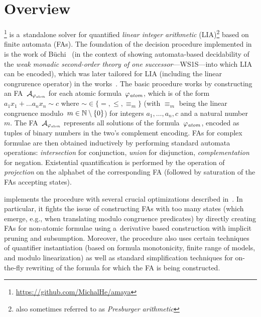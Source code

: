 \documentclass[acmsmall,screen,nonacm=true]{acmart}
\begin{document}
\vspace{-0.0mm}
\section{Overview}
\vspace{-0.0mm}

\amaya\footnote{\url{https://github.com/MichalHe/amaya}} is a~standalone solver for
quantified \emph{linear integer arithmetic}
(LIA)\footnote{also sometimes referred to as \emph{Presburger arithmetic}}
based on finite automata (FAs).
The foundation of the decision procedure implemented in \amaya 
is the work of B\"{u}chi~\cite{Buchi60} (in the context of showing
automata-based decidability of the \emph{weak monadic second-order theory of
one successor}---WS1S---into which LIA can be encoded), which was later
tailored for LIA (including the linear congrurence operator) in the
works~\cite{BoudetC96,BoigelotJW05,Durand-GasselinH10}.
The basic procedure works by constructing an FA~$\mathcal{A}_{\varphi_{\mathit{atom}}}$ for
each atomic formula~$\varphi_{\mathit{atom}}$, which
is of the form $a_1 x_1 + \ldots a_n x_n \sim c$ where ${\sim} \in \{{=},
{\leq}, {\equiv_m}\}$ (with $\equiv_m$ being the linear congruence modulo~$m \in \mathbb{N} \setminus \{0\}$)
for integers $a_1, \ldots, a_n, c$ and a natural number~$m$.
The FA~$\mathcal{A}_{\varphi_{\mathit{atom}}}$ represents all solutions of the formula~$\varphi_{\mathit{atom}}$,
encoded as tuples of binary numbers in the two's complement encoding.
FAs for complex formulae are then obtained inductively by performing standard
automata operations: \emph{intersection} for conjunction, \emph{union} for disjunction,
\emph{complementation} for negation.
Existential quantification is performed by the operation of \emph{projection}
on the alphabet of the corresponding FA (followed by saturation of the FAs
accepting states).

\amaya implements the procedure with several crucial optimizations described
in~\cite{HabermehlHHHL24}.
In particular, it fights the issue of constructing FAs with too many states
(which emerge, e.g., when translating modulo congruence predicates) by directly
creating FAs for non-atomic formulae using a~derivative based construction with
implicit pruning and subsumption.
Moreover, the procedure also uses certain techniques of quantifier
instantiation (based on formula monotonicity, finite range of models, and
modulo linearization) as well as standard simplification techniques for
on-the-fly rewriting of the formula for which the FA is being constructed. 
\end{document}
